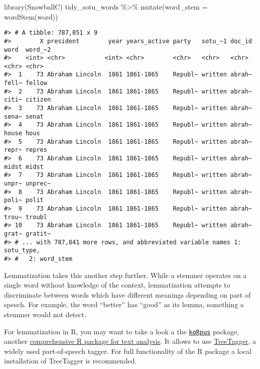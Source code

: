 \documentclass[
]{book}
\newenvironment{Shaded}{\begin{snugshade}}{\end{snugshade}}
\newcommand{\AttributeTok}[1]{\textcolor[rgb]{0.77,0.63,0.00}{#1}}
\newcommand{\FunctionTok}[1]{\textcolor[rgb]{0.00,0.00,0.00}{#1}}
\newcommand{\NormalTok}[1]{#1}
\newcommand{\SpecialCharTok}[1]{\textcolor[rgb]{0.00,0.00,0.00}{#1}}
\begin{document}
\begin{Shaded}
\begin{Highlighting}[]
\FunctionTok{library}\NormalTok{(SnowballC)}
\NormalTok{tidy\_sotu\_words }\SpecialCharTok{\%\textgreater{}\%}
        \FunctionTok{mutate}\NormalTok{(}\AttributeTok{word\_stem =} \FunctionTok{wordStem}\NormalTok{(word))}
\end{Highlighting}
\end{Shaded}

\begin{verbatim}
#> # A tibble: 787,851 x 9
#>        X president        year years_active party   sotu_~1 doc_id word  word_~2
#>    <int> <chr>           <int> <chr>        <chr>   <chr>   <chr>  <chr> <chr>  
#>  1    73 Abraham Lincoln  1861 1861-1865    Republ~ written abrah~ fell~ fellow 
#>  2    73 Abraham Lincoln  1861 1861-1865    Republ~ written abrah~ citi~ citizen
#>  3    73 Abraham Lincoln  1861 1861-1865    Republ~ written abrah~ sena~ senat  
#>  4    73 Abraham Lincoln  1861 1861-1865    Republ~ written abrah~ house hous   
#>  5    73 Abraham Lincoln  1861 1861-1865    Republ~ written abrah~ repr~ repres 
#>  6    73 Abraham Lincoln  1861 1861-1865    Republ~ written abrah~ midst midst  
#>  7    73 Abraham Lincoln  1861 1861-1865    Republ~ written abrah~ unpr~ unprec~
#>  8    73 Abraham Lincoln  1861 1861-1865    Republ~ written abrah~ poli~ polit  
#>  9    73 Abraham Lincoln  1861 1861-1865    Republ~ written abrah~ trou~ troubl 
#> 10    73 Abraham Lincoln  1861 1861-1865    Republ~ written abrah~ grat~ gratit~
#> # ... with 787,841 more rows, and abbreviated variable names 1: sotu_type,
#> #   2: word_stem
\end{verbatim}

Lemmatization takes this another step further. While a stemmer operates on a single word without knowledge of the context, lemmatization attempts to discriminate between words which have different meanings depending on part of speech. For example, the word ``better'' has ``good'' as its lemma, something a stemmer would not detect.

For lemmatization in R, you may want to take a look a the \href{https://CRAN.R-project.org/package=koRpus}{\texttt{koRpus}} package, another \href{https://cran.r-project.org/web/packages/koRpus/vignettes/koRpus_vignette.html}{comprehensive R package for text analysis}. It allows to use \href{http://www.cis.uni-muenchen.de/~schmid/tools/TreeTagger/}{TreeTagger}, a widely used part-of-speech tagger. For full functionality of the R package a local installation of TreeTagger is recommended.
\end{document}
